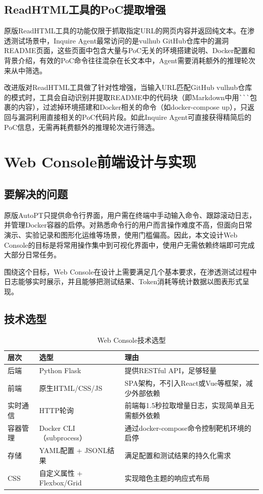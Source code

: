 \subsection{ReadHTML工具的PoC提取增强}

原版ReadHTML工具的功能仅限于抓取指定URL的网页内容并返回纯文本。在渗透测试场景中，Inquire Agent最常访问的是vulhub GitHub仓库中的漏洞README页面，这些页面中包含大量与PoC无关的环境搭建说明、Docker配置和背景介绍，有效的PoC命令往往混杂在长文本中，Agent需要消耗额外的推理轮次来从中筛选。

改进版对ReadHTML工具做了针对性增强，当输入URL匹配GitHub vulhub仓库的模式时，工具会自动识别并提取README中的代码块（即Markdown中用\verb|```|包裹的内容），过滤掉环境搭建和Docker相关的命令（如docker-compose up），只返回与漏洞利用直接相关的PoC代码片段。如此Inquire Agent可直接获得精简后的PoC信息，无需再耗费额外的推理轮次进行筛选。

\section{Web Console前端设计与实现}

\subsection{要解决的问题}

原版AutoPT只提供命令行界面，用户需在终端中手动输入命令、跟踪滚动日志，并管理Docker容器的启停。对熟悉命令行的用户而言操作难度不高，但面向日常演示、实验记录和图形化运维等场景，使用门槛偏高。因此，本文设计Web Console的目标是将常用操作集中到可视化界面中，使用户无需依赖终端即可完成大部分日常任务。

围绕这个目标，Web Console在设计上需要满足几个基本要求，在渗透测试过程中日志能够实时展示，并且能够把测试结果、Token消耗等统计数据以图表形式呈现。

\subsection{技术选型}

\begin{table}[htbp]
\centering
\caption{Web Console技术选型} \label{tab:ch3:6}
  \renewcommand{\arraystretch}{1.3}
\begin{tabular}{lll}
    \toprule
层次 & 选型 & 理由 \\
    \midrule
后端 & Python Flask & 提供RESTful API，足够轻量 \\
    \midrule
前端 & 原生HTML/CSS/JS & SPA架构，不引入React或Vue等框架，减少外部依赖 \\
    \midrule
实时通信 & HTTP轮询 & 前端每1.5秒拉取增量日志，实现简单且无需额外依赖 \\
    \midrule
容器管理 & Docker CLI（subprocess） & 通过docker-compose命令控制靶机环境的启停 \\
    \midrule
存储 & YAML配置 + JSONL结果 & 满足配置和测试结果的持久化需求 \\
    \midrule
CSS & 自定义属性 + Flexbox/Grid & 实现暗色主题的响应式布局 \\
    \bottomrule
\end{tabular}
\end{table}

